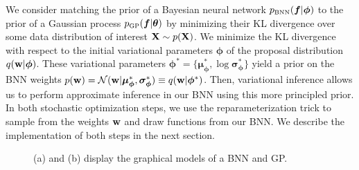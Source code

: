 \documentclass{article}
\begin{document}
We consider matching the prior of a Bayesian neural network $\pbnn (\bm f |\bm \phi )$
to the prior of a Gaussian process $\pgp (\bm f | \bm \theta ) $ 
 by minimizing their KL divergence over 
some data distribution of interest $ \mathbf{X}  \sim p( \mathbf{X} )$. 
We minimize the KL divergence with respect to the initial variational parameters $\bm \phi$ 
of the proposal distribution $q( \mathbf{w}  |\bm \phi)$. 
These variational parameters 
$\bm \phi^* = \{ \bm \mu _{\bm \phi}^* , \log \bm \sigma _{\bm \phi} ^* \} $ 
yield a prior on the BNN weights 
$p( \mathbf{w} ) = \mathcal{N} ( \mathbf{w}  |\bm \mu _{\bm \phi}^* , \bm \sigma _{\bm \phi} ^* )\equiv q( \mathbf{w}  | \bm \phi ^*)$. 
Then, variational inference allows us to perform approximate inference in our BNN using this more 
principled prior. In both stochastic optimization steps, we use the reparameterization trick \citet{vae} to sample from the weights $ \mathbf{w} $ and draw functions from our BNN. 
We describe the implementation of both steps in the next section. 


\begin{figure}[h]\centering
{}
\hspace*{2.5cm}
\caption{ (a) and (b) display the graphical models of a BNN and GP.
} \label{fig:1}
\end{figure}
\end{document}
